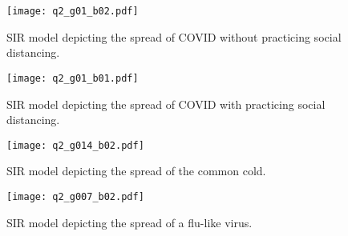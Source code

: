 \documentclass[apj]{emulateapj}
\begin{document}
\begin{figure}
\texttt{[image: q2\_g01\_b02.pdf]}
\caption{SIR model depicting the spread of COVID without practicing social distancing.}
\end{figure}

\begin{figure}
\texttt{[image: q2\_g01\_b01.pdf]}
\caption{SIR model depicting the spread of COVID with practicing social distancing.}
\end{figure}

\begin{figure}
\texttt{[image: q2\_g014\_b02.pdf]}
\caption{SIR model depicting the spread of the common cold.}
\end{figure}

\begin{figure}
\texttt{[image: q2\_g007\_b02.pdf]}
\caption{SIR model depicting the spread of a flu-like virus.}
\end{figure}
\end{document}
